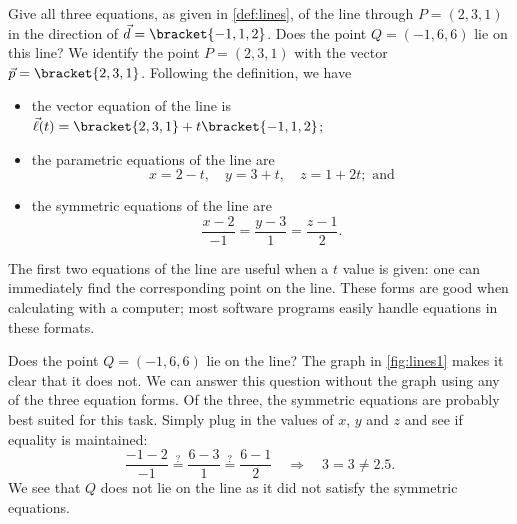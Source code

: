 \begin{example}\label{ex_lines1}%
Give all three equations, as given in \autoref{def:lines}, of the line through $P = (2,3,1)$ in the direction of $\vec d =\bracket{-1,1,2}$. Does the point $Q=(-1,6,6)$ lie on this line?
\solution
We identify the point $P=(2,3,1)$ with the vector $\vec p =\bracket{2,3,1}$. Following the definition, we have
\begin{itemize}
	\item the vector equation of the line is $\vec\ell(t) =\bracket{2,3,1}+ t\bracket{-1,1,2}$;
	\item	the parametric equations of the line are
	\[x = 2-t,\quad y = 3+t,\quad z = 1+2t; \text{ and}\]
	\item	the symmetric equations of the line are
	\[\frac{x-2}{-1}=\frac{y-3}{1} = \frac{z-1}{2}.\]
\end{itemize}

The first two equations of the line are useful when a $t$ value is given: one can immediately find the corresponding point on the line. These forms are good when calculating with a computer; most software programs easily handle equations in these formats.


Does the point $Q = (-1,6,6)$ lie on the line? The graph in \autoref{fig:lines1} makes it clear that it does not. We can answer this question without the graph using any of the three equation forms. Of the three, the symmetric equations are probably best suited for this task. Simply plug in the values of $x$, $y$ and $z$ and see if equality is maintained:
\[
\frac{-1-2}{-1} \stackrel{?}{=} \frac{6-3}{1} \stackrel{?}{=} \frac{6-1}{2}
\quad \Rightarrow \quad 3=3\neq2.5.
\]
We see that $Q$ does not lie on the line as it did not satisfy the symmetric equations.
\end{example}

